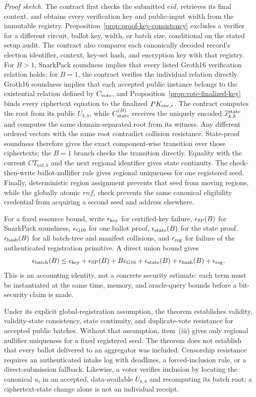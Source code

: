 \documentclass[pdflatex,sn-mathphys-num]{sn-jnl}%
\theoremstyle{thmstyleone}%
\theoremstyle{thmstyletwo}%
\theoremstyle{thmstylethree}%
\begin{document}
\textit{Proof sketch.} The contract first checks the submitted $eid$, retrieves its final context, and obtains every verification key and public-input width from the immutable registry. Proposition~\ref{prop:proof-key-consistency} excludes a verifier for a different circuit, ballot key, width, or batch size, conditional on the stated setup audit. The contract also compares each canonically decoded record's election identifier, context, key-set hash, and encryption key with that registry. For $B>1$, SnarkPack soundness implies that every listed Groth16 verification relation holds; for $B=1$, the contract verifies the individual relation directly. Groth16 soundness implies that each accepted public instance belongs to the existential relation defined by $C_{\rm vote}$, and Proposition~\ref{prop:vote-finalized-key} binds every ciphertext equation to the finalized $PK_{{\rm enc},e}$. The contract computes the root from its public $U_{k,b}$, while $C_{\rm state}^{(B)}$ receives the uniquely encoded $\widehat x_{k,b}^{\rm state}$ and computes the same domain-separated root from its witness. Any different ordered vectors with the same root contradict collision resistance. State-proof soundness therefore gives the exact component-wise transition over those ciphertexts; the $B=1$ branch checks the transition directly. Equality with the current $CT_{eid,k}$ and the next regional identifier gives state continuity. The check-then-write ballot-nullifier rule gives regional uniqueness for one registered seed. Finally, deterministic region assignment prevents that seed from moving regions, while the globally atomic $rnf_i$ check prevents the same canonical eligibility credential from acquiring a second seed and address elsewhere.

For a fixed resource bound, write $\epsilon_{\rm key}$ for certified-key
failure, $\epsilon_{\rm SP}(B)$ for SnarkPack soundness, $\epsilon_{\rm G16}$
for one ballot proof, $\epsilon_{\rm state}(B)$ for the state proof,
$\epsilon_{\rm hash}(B)$ for all batch-tree and manifest collisions, and
$\epsilon_{\rm reg}$ for failure of the authenticated registration primitive.
A direct union bound gives
\[
 \epsilon_{\rm batch}(B)\leq \epsilon_{\rm key}
 +\epsilon_{\rm SP}(B)+B\epsilon_{\rm G16}
 +\epsilon_{\rm state}(B)+\epsilon_{\rm hash}(B)+\epsilon_{\rm reg}.
\]
This is an accounting identity, not a concrete security estimate: each term
must be instantiated at the same time, memory, and oracle-query bounds before
a bit-security claim is made.

Under its explicit global-registration assumption, the theorem establishes validity, validity-state consistency, state continuity, and duplicate-vote resistance for accepted public batches. Without that assumption, item~(iii) gives only regional nullifier uniqueness for a fixed registered seed. The theorem does not establish that every ballot delivered to an aggregator was included. Censorship resistance requires an authenticated intake log with deadlines, a forced-inclusion rule, or a direct-submission fallback. Likewise, a voter verifies inclusion by locating the canonical $u_i$ in an accepted, data-available $U_{k,b}$ and recomputing its batch root; a ciphertext-state change alone is not an individual receipt.
\end{document}

